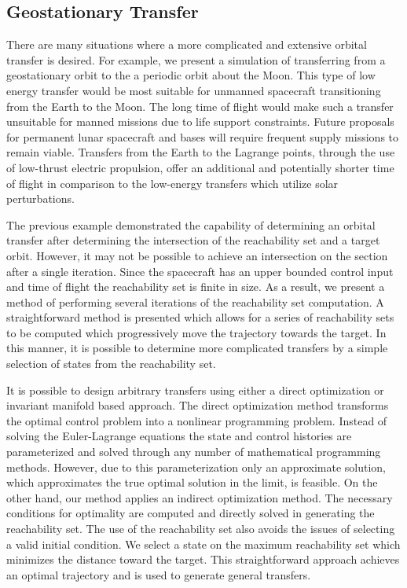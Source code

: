 \documentclass[smallcondensed]{svjour3}
\begin{document}
\subsection{Geostationary Transfer}\label{sec:geo_transfer}

There are many situations where a more complicated and extensive orbital transfer is desired. 
For example, we present a simulation of transferring from a geostationary orbit to the a periodic orbit about the Moon.
This type of low energy transfer would be most suitable for unmanned spacecraft transitioning from the Earth to the Moon.
The long time of flight would make such a transfer unsuitable for manned missions due to life support constraints.
Future proposals for permanent lunar spacecraft and bases will require frequent supply missions to remain viable. 
Transfers from the Earth to the Lagrange points, through the use of low-thrust electric propulsion, offer an additional and potentially shorter time of flight in comparison to the low-energy transfers which utilize solar perturbations.

The previous example demonstrated the capability of determining an orbital transfer after determining the intersection of the reachability set and a target orbit.
However, it may not be possible to achieve an intersection on the \Poincare section after a single iteration. 
Since the spacecraft has an upper bounded control input and time of flight the reachability set is finite in size. 
As a result, we present a method of performing several iterations of the reachability set computation. 
A straightforward method is presented which allows for a series of reachability sets to be computed which progressively move the trajectory towards the target.
In this manner, it is possible to determine more complicated transfers by a simple selection of states from the reachability set.

It is possible to design arbitrary transfers using either a direct optimization or invariant manifold based approach.
The direct optimization method transforms the optimal control problem into a nonlinear programming problem.
Instead of solving the Euler-Lagrange equations the state and control histories are parameterized and solved through any number of mathematical programming methods.
However, due to this parameterization only an approximate solution, which approximates the true optimal solution in the limit, is feasible. 
On the other hand, our method applies an indirect optimization method.
The necessary conditions for optimality are computed and directly solved in generating the reachability set. 
The use of the reachability set also avoids the issues of selecting a valid initial condition.
We select a state on the maximum reachability set which minimizes the distance toward the target. 
This straightforward approach achieves an optimal trajectory and is used to generate general transfers.
\end{document}
